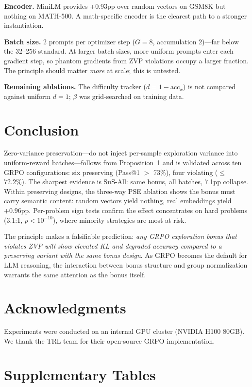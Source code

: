 \documentclass[10pt]{article}
\begin{document}
\textbf{Encoder.} MiniLM provides +0.93pp over random vectors on GSM8K but nothing on MATH-500. A math-specific encoder is the clearest path to a stronger instantiation.

\textbf{Batch size.} 2 prompts per optimizer step ($G{=}8$, accumulation 2)---far below the 32--256 standard. At larger batch sizes, more uniform prompts enter each gradient step, so phantom gradients from ZVP violations occupy a larger fraction. The principle should matter \emph{more} at scale; this is untested.

\textbf{Remaining ablations.} The difficulty tracker ($d = 1 - \text{acc}_x$) is not compared against uniform $d{=}1$; $\beta$ was grid-searched on training data.

\section{Conclusion}
\label{sec:conclusion}

Zero-variance preservation---do not inject per-sample exploration variance into uniform-reward batches---follows from Proposition~1 and is validated across ten GRPO configurations: six preserving (Pass@1 $>$ 73\%), four violating ($\leq$72.2\%). The sharpest evidence is SuS-All: same bonus, all batches, 7.1pp collapse. Within preserving designs, the three-way PSE ablation shows the bonus must carry semantic content: random vectors yield nothing, real embeddings yield +0.96pp. Per-problem sign tests confirm the effect concentrates on hard problems (3.1:1, $p < 10^{-10}$), where minority strategies are most at risk.

The principle makes a falsifiable prediction: \emph{any GRPO exploration bonus that violates ZVP will show elevated KL and degraded accuracy compared to a preserving variant with the same bonus design}. As GRPO becomes the default for LLM reasoning, the interaction between bonus structure and group normalization warrants the same attention as the bonus itself.

\section*{Acknowledgments}

Experiments were conducted on an internal GPU cluster (NVIDIA H100 80GB). We thank the TRL team for their open-source GRPO implementation.




\clearpage
\appendix
\section{Supplementary Tables}
\label{app:supplementary}




\end{document}
